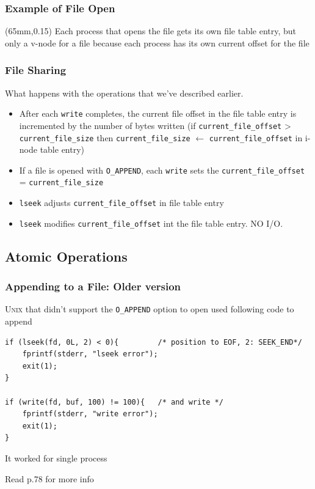 \documentclass[newPxFont,sthlmFooter,nooffset]{beamer}
\begin{document}
\begin{frame}
  \frametitle{Example of File Open}
\centering
{}
\begin{textblock*}{60mm}(65mm,0.15\textheight)
{\footnotesize Each process that opens the file gets its own file table entry, but only a v-node for a file because each process has its own current offset for the file }
\end{textblock*}
\end{frame}

\begin{frame}[t]
  \frametitle{File Sharing}
What happens with the operations that we've described earlier.
\begin{itemize}
\item After each \texttt{write} completes, the current file offset in the file table entry is incremented by the number of bytes written (if \texttt{current\_file\_offset} > \texttt{current\_file\_size} then \texttt{current\_file\_size} $\leftarrow$ \texttt{current\_file\_offset} in i-node table entry)
\item If a file is opened with \texttt{O\_APPEND}, each \texttt{write} sets the \texttt{current\_file\_offset} = \texttt{current\_file\_size}
\item \texttt{lseek} adjusts \texttt{current\_file\_offset} in file table entry
\item \texttt{lseek} modifies \texttt{current\_file\_offset} int the file table entry. NO I/O.
\end{itemize}
\end{frame}

\subsection{Atomic Operations}

\begin{frame}[containsverbatim,t]
  \frametitle{Appending to a  File: Older version}

\textsc{Unix} that didn't support the \texttt{O\_APPEND} option to open used following code to append

\begin{lstlisting}
if (lseek(fd, 0L, 2) < 0){         /* position to EOF, 2: SEEK_END*/
    fprintf(stderr, "lseek error");
    exit(1);
}

if (write(fd, buf, 100) != 100){   /* and write */
    fprintf(stderr, "write error");  
    exit(1);
}

\end{lstlisting}
\bigskip
It worked for single process 

\bigskip
Read p.78 for more info
\end{frame}
\end{document}
